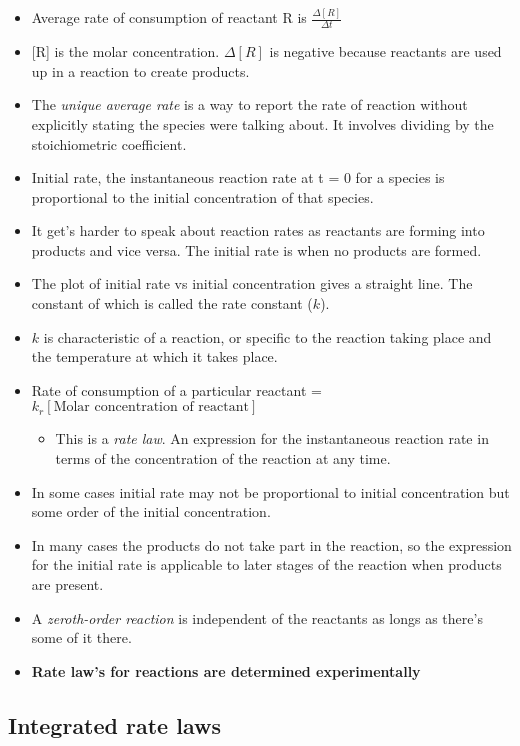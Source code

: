 \documentclass[12pt]{article}
\begin{document}
\begin{itemize}
\item
  Average rate of consumption of reactant R is
  \(\frac{\Delta[R]}{\Delta t}\)
\item
  {[}R{]} is the molar concentration. \(\Delta[R]\) is negative because
  reactants are used up in a reaction to create products.
\item
  The \emph{unique average rate} is a way to report the rate of reaction
  without explicitly stating the species were talking about. It involves
  dividing by the stoichiometric coefficient.
\item
  Initial rate, the instantaneous reaction rate at t = 0 for a species
  is proportional to the initial concentration of that species.
\item
  It get's harder to speak about reaction rates as reactants are forming
  into products and vice versa. The initial rate is when no products are
  formed.
\item
  The plot of initial rate vs initial concentration gives a straight
  line. The constant of which is called the rate constant (\(k\)).
\item \(k\) is characteristic of a reaction, or specific to the reaction
  taking place and the temperature at which it takes place.
\item Rate of consumption of a particular reactant = \(k_r[\text{Molar concentration of reactant}]\)

  \begin{itemize}
  \item
    This is a \emph{rate law}. An expression for the instantaneous
    reaction rate in terms of the concentration of the reaction at any
    time.
  \end{itemize}
\item
  In some cases initial rate may not be proportional to initial
  concentration but some order of the initial concentration.
\item
  In many cases the products do not take part in the reaction, so the
  expression for the initial rate is applicable to later stages of the
  reaction when products are present.
\item
  A \emph{zeroth-order reaction} is independent of the reactants as
  longs as there's some of it there.
\item
  \textbf{Rate law's for reactions are determined experimentally}
\end{itemize}

\subsection{Integrated rate laws}\label{integrated-rate-laws}
\end{document}
